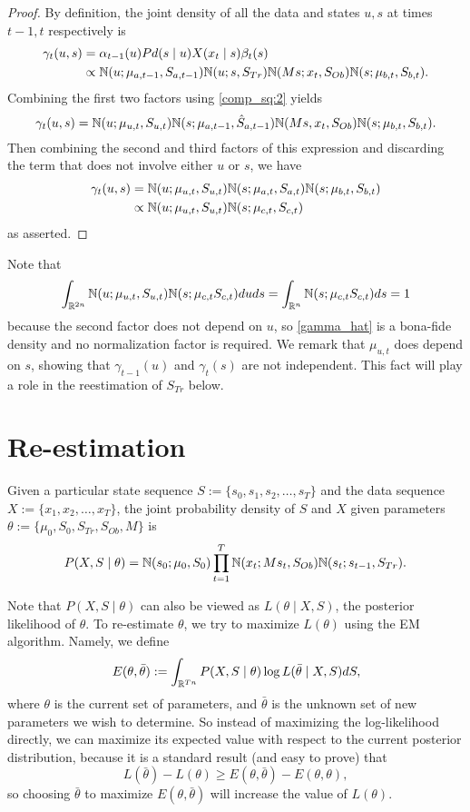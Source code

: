 \documentclass[12pt,leqno]{article}
\begin{document}
\begin{proof}
  By definition, the joint density of all the data and states $u,s$ at times $t-1,t$ respectively is 
  \begin{align*}
    \gamma_t(u,s) &= \alpha_{t-1}(u)Pd(s\mid u)X(x_t\mid s)\beta_t(s) \\
    &\propto {\mathbb N}(u;\mu_{a,t-1},S_{a,t-1}){\mathbb N}(u;s,S_{Tr}){\mathbb N}(Ms;x_t,S_{Ob}){\mathbb N}(s;\mu_{b,t},S_{b,t}).
  \end{align*}
  Combining the first two factors using \eqref{comp_sq:2} yields
  $$
    \gamma_t(u,s) = {\mathbb N}(u;\mu_{u,t},S_{u,t}){\mathbb N}(s;\mu_{a,t-1},\hat{S}_{a,t-1}){\mathbb N}(Ms,x_t,S_{Ob}){\mathbb N}(s;\mu_{b,t},S_{b,t}).
    $$
    Then combining the second and third factors of this expression and discarding the term that does not involve either $u$ or $s$,
    we have
    \begin{align*}
      \gamma_t(u,s) &= {\mathbb N}(u;\mu_{u,t},S_{u,t}){\mathbb N}(s;\mu_{a,t},S_{a,t}){\mathbb N}(s;\mu_{b,t},S_{b,t})\\
      &\propto {\mathbb N}(u;\mu_{u,t},S_{u,t}){\mathbb N}(s;\mu_{c,t},S_{c,t})
    \end{align*}
    as asserted.
    \end{proof}
  Note that
  $$
  \int_{{\mathbb R}^{2n}}{\mathbb N}(u;\mu_{u,t},S_{u,t}){\mathbb N}(s;\mu_{c,t}S_{c,t})duds = \int_{{\mathbb R}^n}{\mathbb N}(s;\mu_{c,t}S_{c,t})ds = 1 
  $$
  because the second factor does not depend on $u$, so \eqref{gamma_hat} is a bona-fide density and no
  normalization factor is required.  We remark that $\mu_{u,t}$ does depend on $s$, showing that $\gamma_{t-1}(u)$
  and $\gamma_t(s)$ are not independent.  This fact will play a role in the reestimation of $S_{Tr}$ below.
  
\section{Re-estimation}
Given a particular state sequence $S := \{s_0,s_1,s_2,\dots,s_T\}$ and the data sequence $X := \{x_1,x_2,\dots,x_T\}$,
the joint probability density of $S$ and $X$ given parameters $\theta := \{\mu_0,S_0,S_{Tr},S_{Ob},M\}$ is
$$
P(X,S\mid\theta) = {\mathbb N}(s_0;\mu_0,S_0)\prod_{t=1}^T{\mathbb N}(x_t;Ms_t,S_{Ob}){\mathbb N}(s_t;s_{t-1},S_{Tr}).
$$

Note that $P(X,S\mid\theta)$ can also be viewed as  $L(\theta\mid X,S)$, the posterior likelihood of $\theta$.
To re-estimate $\theta$, we try to maximize $L(\theta)$ using the EM algorithm. Namely, we define 
$$
E(\theta,\bar{\theta}) := \int_{{\mathbb R}^{Tn}}P(X,S\mid\theta)\log{L(\bar{\theta}\mid X,S)}dS,
$$
where $\theta$ is the current set of parameters, and $\bar{\theta}$ is the unknown set of new parameters
we wish to determine. So instead of maximizing the log-likelihood directly, we can maximize its expected
value with respect to the current posterior distribution, because it is a standard result (and easy to prove) that
$$
L(\bar{\theta}) - L(\theta) \ge E(\theta,\bar{\theta}) - E(\theta,\theta),
$$
so choosing $\bar{\theta}$ to maximize $E(\theta,\bar{\theta})$ will increase the value of $L(\theta)$.
\end{document}
